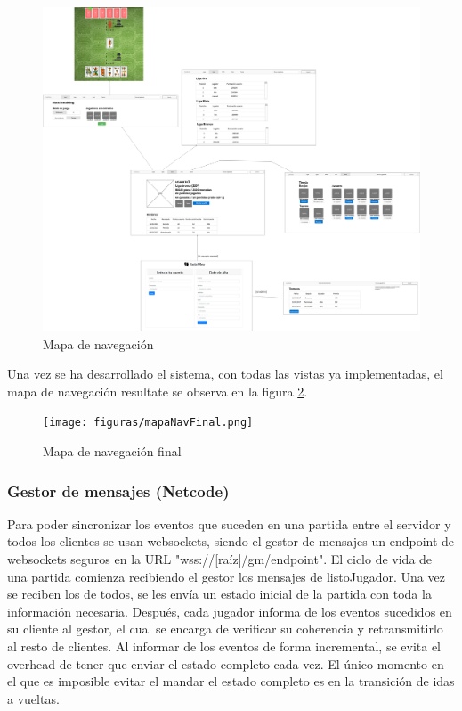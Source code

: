\begin{figure}[H]
  \includegraphics[width=\linewidth]{figuras/mapaNavegacion.png}
  \caption{Mapa de navegación}
  \label{fig:mapaDeNavegacion}
\end{figure}

Una vez se ha desarrollado el sistema, con todas las vistas ya implementadas, el mapa de navegación resultate se observa en la figura \ref{fig:mapaDeNavegacionFinal}.

\begin{figure}[H]
  \texttt{[image: figuras/mapaNavFinal.png]}
  \caption{Mapa de navegación final}
  \label{fig:mapaDeNavegacionFinal}
\end{figure}

\subsubsection{Gestor de mensajes (Netcode)}

Para poder sincronizar los eventos que suceden en una partida entre el servidor y todos los clientes se usan websockets,
siendo el gestor de mensajes un endpoint de websockets seguros en la URL "wss://[raíz]/gm/endpoint". 
El ciclo de vida de una partida comienza recibiendo el gestor los mensajes de listoJugador. Una vez se reciben los de todos,
se les envía un estado inicial de la partida con toda la información necesaria. Después, cada jugador informa de los eventos
sucedidos en su cliente al gestor, el cual se encarga de verificar su coherencia y retransmitirlo al resto de clientes. Al
informar de los eventos de forma incremental, se evita el overhead de tener que enviar el estado completo cada vez. El único
momento en el que es imposible evitar el mandar el estado completo es en la transición de idas a vueltas.\\

